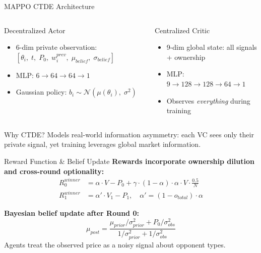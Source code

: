 \documentclass[aspectratio=169]{beamer}
\begin{document}
\begin{frame}{MAPPO CTDE Architecture}
  \begin{columns}[T]
    \begin{block}{Decentralized Actor}
      \begin{itemize}
        \item 6-dim private observation: $[\theta_i,\;t,\;P_0,\;w_i^{prev},\;\mu_{belief},\;\sigma_{belief}]$
        \item MLP: $6 \to 64 \to 64 \to 1$
        \item Gaussian policy: $b_i \sim \mathcal{N}(\mu(\theta_i),\;\sigma^2)$
      \end{itemize}
    \end{block}

    \begin{block}{Centralized Critic}
      \begin{itemize}
        \item 9-dim global state: all signals + ownership
        \item MLP: $9 \to 128 \to 128 \to 64 \to 1$
        \item Observes \emph{everything} during training
      \end{itemize}
    \end{block}
  \end{columns}

  \vspace{0.3cm}
  \begin{block}{Why CTDE?}
    Models real-world information asymmetry: each VC sees only their private signal, yet training leverages global market information.
  \end{block}
\end{frame}

\begin{frame}{Reward Function \& Belief Update}
  \textbf{Rewards incorporate ownership dilution and cross-round optionality:}
  \begin{align*}
    R_0^{winner} &= \alpha \cdot V - P_0 + \gamma \cdot (1-\alpha) \cdot \alpha \cdot V \cdot \frac{0.5}{N} \\[0.3em]
    R_1^{winner} &= \alpha' \cdot V_1 - P_1, \quad \alpha' = (1 - o_{total}) \cdot \alpha
  \end{align*}

  \vspace{0.3cm}
  \textbf{Bayesian belief update after Round 0:}
  \begin{equation*}
    \mu_{post} = \frac{\mu_{prior}/\sigma_{prior}^2 + P_0/\sigma_{obs}^2}{1/\sigma_{prior}^2 + 1/\sigma_{obs}^2}
  \end{equation*}
  Agents treat the observed price as a noisy signal about opponent types.
\end{frame}
\end{document}
